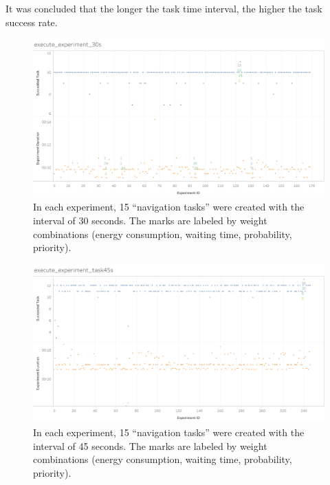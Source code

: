 It was concluded that the longer the task time interval, the higher the task success rate.

\begin{figure}[htbp]
 \centering
 \includegraphics[width = 1.0\textwidth]{content/images/ch5/execute_experiment_30s.png}
 \caption{In each experiment, 15 ``navigation tasks'' were created with the interval of 30 seconds. The marks are labeled by weight combinations (energy consumption, waiting time, probability, priority).}
 \label{fig:experiment_task_30s}
\end{figure}

\begin{figure}[htbp]
 \centering
 \includegraphics[width = 1.0\textwidth]{content/images/ch5/execute_experiment_45s.png}
 \caption{In each experiment, 15 ``navigation tasks'' were created with the interval of 45 seconds. The marks are labeled by weight combinations (energy consumption, waiting time, probability, priority).}
 \label{fig:experiment_task_45s}
\end{figure}

